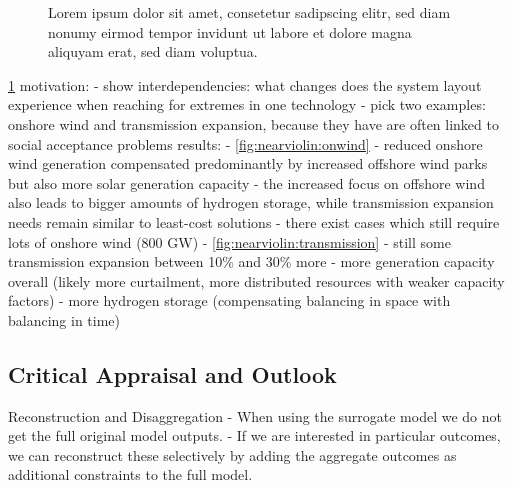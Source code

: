 \begin{figure}
    \noindent{}
    \caption{Lorem ipsum dolor sit amet, consetetur sadipscing elitr, sed diam nonumy eirmod tempor invidunt ut labore et dolore magna aliquyam erat, sed diam voluptua.}
    \label{fig:nearviolin}
\end{figure}

\cref{fig:nearviolin}
motivation:
- show interdependencies: what changes does the system layout experience when reaching for extremes in one technology
- pick two examples: onshore wind and transmission expansion, because they have are often linked to social acceptance problems
results:
- \cref{fig:nearviolin:onwind}
  - reduced onshore wind generation compensated predominantly by increased offshore wind parks but also more solar generation capacity
  - the increased focus on offshore wind also leads to bigger amounts of hydrogen storage, while transmission expansion needs remain similar to least-cost solutions
  - there exist cases which still require lots of onshore wind (800 GW)
- \cref{fig:nearviolin:transmission}
  - still some transmission expansion between 10\% and 30\% more
  - more generation capacity overall (likely more curtailment, more distributed resources with weaker capacity factors)
  - more hydrogen storage (compensating balancing in space with balancing in time)

\subsection{Critical Appraisal and Outlook}

Reconstruction and Disaggregation
- When using the surrogate model we do not get the full original model outputs.
- If we are interested in particular outcomes, we can reconstruct these selectively
by adding the aggregate outcomes as additional constraints to the full model.

